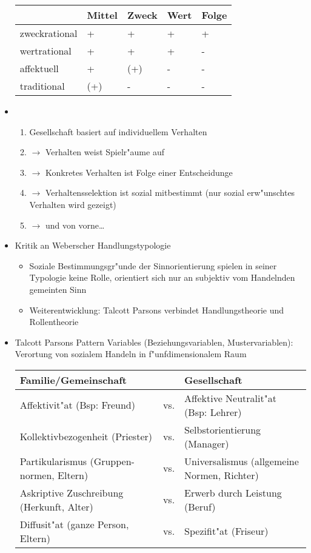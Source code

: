 \documentclass[a4paper, 12pt]{scrartcl}
\begin{document}
\begin{itemize}
		\begin{tabular}[H]{lllll}
			& Mittel & Zweck & Wert & Folge \\ \hline
			zweckrational & + & + & + & + \\ \hline
			wertrational & + & + & + & - \\ \hline
			affektuell & + & (+) & - & - \\ \hline
			traditional & (+) & - & - & - \\ \hline
		\end{tabular}


	\item
		\begin{enumerate}
			\item Gesellschaft basiert auf individuellem Verhalten 
	\item$\rightarrow$ Verhalten weist Spielr"aume auf 
	\item$\rightarrow$ Konkretes Verhalten ist Folge einer Entscheidunge 
	\item$\rightarrow$ Verhaltensselektion ist sozial mitbestimmt (nur sozial erw"unschtes Verhalten wird gezeigt) 
	\item$\rightarrow$ und von vorne\dots
		\end{enumerate}

	\item
		Kritik an Weberscher Handlungstypologie
		\begin{itemize}
			\item
				Soziale Bestimmungsgr"unde der Sinnorientierung spielen in seiner Typologie keine Rolle, orientiert sich nur an subjektiv vom Handelnden gemeinten Sinn
				\item
					Weiterentwicklung: Talcott Parsons verbindet Handlungstheorie und Rollentheorie
		\end{itemize}
	\item
		Talcott Parsons Pattern Variables (Beziehungsvariablen, Mustervariablen): Verortung von sozialem Handeln in f"unfdimensionalem Raum

		\begin{tabular}[H]{lcl}
			Familie/Gemeinschaft & & Gesellschaft\\\hline
			Affektivit"at (Bsp: Freund) & vs. & Affektive Neutralit"at (Bsp: Lehrer) \\ \hline
			Kollektivbezogenheit (Priester) & vs. & Selbstorientierung (Manager) \\ \hline
			Partikularismus (Gruppen-normen, Eltern) & vs. & Universalismus (allgemeine Normen, Richter) \\ \hline
			Askriptive Zuschreibung (Herkunft, Alter) & vs. & Erwerb durch Leistung (Beruf) \\ \hline
			Diffusit"at (ganze Person, Eltern) & vs. & Spezifit"at (Friseur) \\ \hline
		\end{tabular}


\end{itemize}
\end{document}
